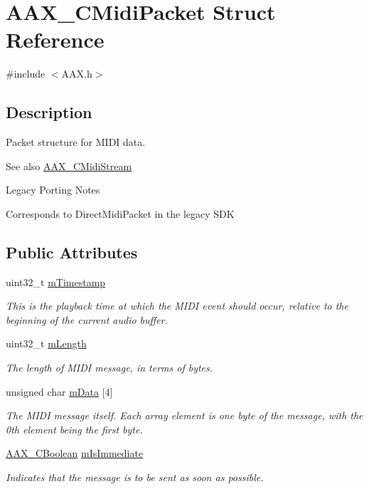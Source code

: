 \hypertarget{a00024}{}\section{A\+A\+X\+\_\+\+C\+Midi\+Packet Struct Reference}
\label{a00024}


{\ttfamily \#include $<$A\+A\+X.\+h$>$}



\subsection{Description}
Packet structure for M\+I\+D\+I data. 

\begin{DoxySeeAlso}{See also}
\hyperlink{a00025}{A\+A\+X\+\_\+\+C\+Midi\+Stream}
\end{DoxySeeAlso}
\begin{DoxyRefDesc}{Legacy Porting Notes}
\item[\hyperlink{a00384__porting_notes000003}{Legacy Porting Notes}]Corresponds to Direct\+Midi\+Packet in the legacy S\+D\+K \end{DoxyRefDesc}
\subsection*{Public Attributes}
\begin{DoxyCompactItemize}
\item 
uint32\+\_\+t \hyperlink{a00024_a76df0e71968aa1416b93015ebf23ddc5}{m\+Timestamp}
\begin{DoxyCompactList}\small\item\em This is the playback time at which the M\+I\+D\+I event should occur, relative to the beginning of the current audio buffer. \end{DoxyCompactList}\item 
uint32\+\_\+t \hyperlink{a00024_aa0f16872a37737488aa42f1d9614d6a5}{m\+Length}
\begin{DoxyCompactList}\small\item\em The length of M\+I\+D\+I message, in terms of bytes. \end{DoxyCompactList}\item 
unsigned char \hyperlink{a00024_aac7229afc36006bc673eb219b18d8220}{m\+Data} \mbox{[}4\mbox{]}
\begin{DoxyCompactList}\small\item\em The M\+I\+D\+I message itself. Each array element is one byte of the message, with the 0th element being the first byte. \end{DoxyCompactList}\item 
\hyperlink{a00149_aa216506530f1d19a2965931ced2b274b}{A\+A\+X\+\_\+\+C\+Boolean} \hyperlink{a00024_ab6fce0aee8fb08695ac8a112b3c3e7fa}{m\+Is\+Immediate}
\begin{DoxyCompactList}\small\item\em Indicates that the message is to be sent as soon as possible. \end{DoxyCompactList}\end{DoxyCompactItemize}


